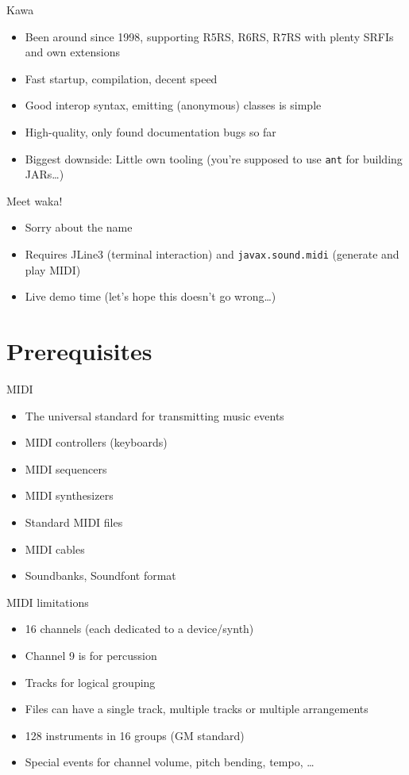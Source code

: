 \documentclass[presentation]{beamer}
\begin{document}
\begin{frame}[fragile,label=sec-1-4]{Kawa}
 \begin{itemize}
\item Been around since 1998, supporting R5RS, R6RS, R7RS with plenty
SRFIs and own extensions
\item Fast startup, compilation, decent speed
\item Good interop syntax, emitting (anonymous) classes is simple
\item High-quality, only found documentation bugs so far
\item Biggest downside: Little own tooling (you're supposed to use \texttt{ant}
  for building JARs\ldots{})
\end{itemize}
\end{frame}

\begin{frame}[fragile,label=sec-1-5]{Meet waka!}
 \begin{itemize}
\item Sorry about the name
\item Requires JLine3 (terminal interaction) and \texttt{javax.sound.midi}
  (generate and play MIDI)
\item Live demo time (let's hope this doesn't go wrong\ldots{})
\end{itemize}
\end{frame}

\section{Prerequisites}
\label{sec-2}

\begin{frame}[label=sec-2-1]{MIDI}
\begin{itemize}
\item The universal standard for transmitting music events
\item MIDI controllers (keyboards)
\item MIDI sequencers
\item MIDI synthesizers
\item Standard MIDI files
\item MIDI cables
\item Soundbanks, Soundfont format
\end{itemize}
\end{frame}

\begin{frame}[label=sec-2-2]{MIDI limitations}
\begin{itemize}
\item 16 channels (each dedicated to a device/synth)
\item Channel 9 is for percussion
\item Tracks for logical grouping
\item Files can have a single track, multiple tracks or multiple
arrangements
\item 128 instruments in 16 groups (GM standard)
\item Special events for channel volume, pitch bending, tempo, \ldots{}
\end{itemize}
\end{frame}
\end{document}
